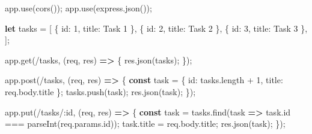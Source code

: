 \documentclass[
  a4paper,
  DIV=11,
  numbers=noendperiod,
  onepage,
  openany]{scrreprt}
\newenvironment{Shaded}{\begin{snugshade}}{\end{snugshade}}
\newcommand{\AttributeTok}[1]{\textcolor[rgb]{0.40,0.45,0.13}{#1}}
\newcommand{\DataTypeTok}[1]{\textcolor[rgb]{0.68,0.00,0.00}{#1}}
\newcommand{\DecValTok}[1]{\textcolor[rgb]{0.68,0.00,0.00}{#1}}
\newcommand{\FunctionTok}[1]{\textcolor[rgb]{0.28,0.35,0.67}{#1}}
\newcommand{\KeywordTok}[1]{\textcolor[rgb]{0.00,0.23,0.31}{\textbf{#1}}}
\newcommand{\NormalTok}[1]{\textcolor[rgb]{0.00,0.23,0.31}{#1}}
\newcommand{\OperatorTok}[1]{\textcolor[rgb]{0.37,0.37,0.37}{#1}}
\newcommand{\PreprocessorTok}[1]{\textcolor[rgb]{0.68,0.00,0.00}{#1}}
\newcommand{\StringTok}[1]{\textcolor[rgb]{0.13,0.47,0.30}{#1}}
\begin{document}
\begin{tcolorbox}
\begin{Shaded}
\begin{Highlighting}[]
\NormalTok{app}\OperatorTok{.}\FunctionTok{use}\NormalTok{(}\FunctionTok{cors}\NormalTok{())}\OperatorTok{;}
\NormalTok{app}\OperatorTok{.}\FunctionTok{use}\NormalTok{(express}\OperatorTok{.}\FunctionTok{json}\NormalTok{())}\OperatorTok{;}

\KeywordTok{let}\NormalTok{ tasks }\OperatorTok{=}\NormalTok{ [}
\NormalTok{  \{ }\DataTypeTok{id}\OperatorTok{:} \DecValTok{1}\OperatorTok{,} \DataTypeTok{title}\OperatorTok{:} \StringTok{\textquotesingle{}Task 1\textquotesingle{}}\NormalTok{ \}}\OperatorTok{,}
\NormalTok{  \{ }\DataTypeTok{id}\OperatorTok{:} \DecValTok{2}\OperatorTok{,} \DataTypeTok{title}\OperatorTok{:} \StringTok{\textquotesingle{}Task 2\textquotesingle{}}\NormalTok{ \}}\OperatorTok{,}
\NormalTok{  \{ }\DataTypeTok{id}\OperatorTok{:} \DecValTok{3}\OperatorTok{,} \DataTypeTok{title}\OperatorTok{:} \StringTok{\textquotesingle{}Task 3\textquotesingle{}}\NormalTok{ \}}\OperatorTok{,}
\NormalTok{]}\OperatorTok{;}

\NormalTok{app}\OperatorTok{.}\FunctionTok{get}\NormalTok{(}\StringTok{\textquotesingle{}/tasks\textquotesingle{}}\OperatorTok{,}\NormalTok{ (req}\OperatorTok{,}\NormalTok{ res) }\KeywordTok{=\textgreater{}}\NormalTok{ \{}
\NormalTok{  res}\OperatorTok{.}\FunctionTok{json}\NormalTok{(tasks)}\OperatorTok{;}
\NormalTok{\})}\OperatorTok{;}

\NormalTok{app}\OperatorTok{.}\FunctionTok{post}\NormalTok{(}\StringTok{\textquotesingle{}/tasks\textquotesingle{}}\OperatorTok{,}\NormalTok{ (req}\OperatorTok{,}\NormalTok{ res) }\KeywordTok{=\textgreater{}}\NormalTok{ \{}
  \KeywordTok{const}\NormalTok{ task }\OperatorTok{=}\NormalTok{ \{ }\DataTypeTok{id}\OperatorTok{:}\NormalTok{ tasks}\OperatorTok{.}\AttributeTok{length} \OperatorTok{+} \DecValTok{1}\OperatorTok{,} \DataTypeTok{title}\OperatorTok{:}\NormalTok{ req}\OperatorTok{.}\AttributeTok{body}\OperatorTok{.}\AttributeTok{title}\NormalTok{ \}}\OperatorTok{;}
\NormalTok{  tasks}\OperatorTok{.}\FunctionTok{push}\NormalTok{(task)}\OperatorTok{;}
\NormalTok{  res}\OperatorTok{.}\FunctionTok{json}\NormalTok{(task)}\OperatorTok{;}
\NormalTok{\})}\OperatorTok{;}

\NormalTok{app}\OperatorTok{.}\FunctionTok{put}\NormalTok{(}\StringTok{\textquotesingle{}/tasks/:id\textquotesingle{}}\OperatorTok{,}\NormalTok{ (req}\OperatorTok{,}\NormalTok{ res) }\KeywordTok{=\textgreater{}}\NormalTok{ \{}
  \KeywordTok{const}\NormalTok{ task }\OperatorTok{=}\NormalTok{ tasks}\OperatorTok{.}\FunctionTok{find}\NormalTok{(task }\KeywordTok{=\textgreater{}}\NormalTok{ task}\OperatorTok{.}\AttributeTok{id} \OperatorTok{===} \PreprocessorTok{parseInt}\NormalTok{(req}\OperatorTok{.}\AttributeTok{params}\OperatorTok{.}\AttributeTok{id}\NormalTok{))}\OperatorTok{;}
\NormalTok{  task}\OperatorTok{.}\AttributeTok{title} \OperatorTok{=}\NormalTok{ req}\OperatorTok{.}\AttributeTok{body}\OperatorTok{.}\AttributeTok{title}\OperatorTok{;}
\NormalTok{  res}\OperatorTok{.}\FunctionTok{json}\NormalTok{(task)}\OperatorTok{;}
\NormalTok{\})}\OperatorTok{;}


\end{Highlighting}
\end{Shaded}
\end{tcolorbox}
\end{document}
